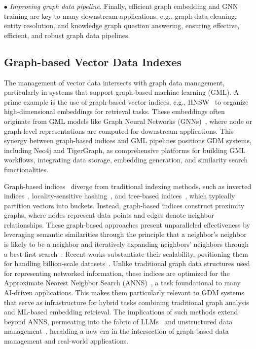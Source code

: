 \documentclass{sig-alternate-10pt}
\begin{document}
\noindent $\bullet$ {\em Improving graph data pipeline}. Finally, efficient graph embedding and GNN training are key to many downstream applications, e.g., graph data cleaning, entity resolution, and knowledge graph question answering, ensuring effective, efficient, and robust graph data pipelines.

\subsection{Graph-based Vector Data Indexes}
\label{sec:index}

\medskip
\medskip

The management of vector data intersects with graph data management, particularly in systems that support graph-based machine learning (GML).
A prime example is the use of graph-based vector indices, e.g., HNSW~\cite{DML11, MYD18HNSW, FXWC19} to organize high-dimensional embeddings for retrieval tasks.
These embeddings often originate from GML models like Graph Neural Networks (GNNs)~\cite{KLJZL20, BMHCRMKD22}, where node or graph-level representations are computed for downstream applications.
This synergy between graph-based indices and GML pipelines positions GDM systems, including Neo4j and TigerGraph, as comprehensive platforms for building GML workflows, integrating data storage, embedding generation, and similarity search functionalities.


Graph-based indices~\cite{PWL23Survey} diverge from traditional indexing methods, such as inverted indices~\cite{BL14II,jds10ii}, locality-sensitive hashing~\cite{AILRS15, TZZ23DB}, and tree-based indices~\cite{BCG05, KS18TB}, which typically partition vectors into buckets.
Instead, graph-based indices construct proximity graphs, where nodes represent data points and edges denote neighbor relationships.
These graph-based approaches present unparalleled effectiveness by leveraging semantic similarities through the principle that a neighbor's neighbor is likely to be a neighbor and iteratively expanding neighbors' neighbors through a best-first search~\cite{FanL19, wang2022crux}.
Recent works substantiate their scalability, positioning them for handling billion-scale datasets~\cite{WXYW21}.
Unlike traditional graph data structures used for representing networked information, these indices are optimized for the Approximate Nearest Neighbor Search (ANNS)~\cite{AIR18anns, LZSWLZL19, WXYW21}, a task foundational to many AI-driven applications.
This makes them particularly relevant to GDM systems that serve as infrastructure for hybrid tasks combining traditional graph analysis and ML-based embedding retrieval.
The implications of such methods extend beyond ANNS, permeating into the fabric of LLMs~\cite{KLJZL20} and unstructured data management~\cite{HHGDAH13, WWWLZLC20}, heralding a new era in the intersection of graph-based data management and real-world applications.
\end{document}
